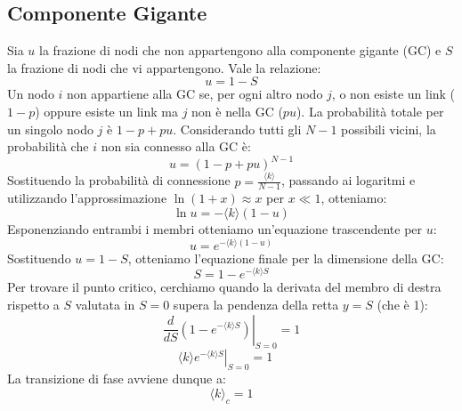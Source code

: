 \documentclass[12pt,italian]{article}
\begin{document}
\subsection{Componente Gigante}\label{sec:GC}
Sia $u$ la frazione di nodi che non appartengono alla componente gigante (GC) e $S$ la frazione di nodi che vi appartengono. Vale la relazione:
\begin{equation}
    u = 1 - S
\end{equation}
Un nodo $i$ non appartiene alla GC se, per ogni altro nodo $j$, o non esiste un link ($1-p$) oppure esiste un link ma $j$ non è nella GC ($pu$). La probabilità totale per un singolo nodo $j$ è
$1 - p + pu$.
Considerando tutti gli $N-1$ possibili vicini, la probabilità che $i$ non sia connesso alla GC è:
\begin{equation}
    u = (1 - p + pu)^{N-1}
\end{equation}
Sostituendo la probabilità di connessione $p = \frac{\langle k \rangle}{N-1}$, passando ai logaritmi e utilizzando l'approssimazione $\ln(1+x) \approx x$ per $x \ll 1$, otteniamo:
\begin{equation}
    \ln u = -\langle k \rangle (1-u)
\end{equation}
Esponenziando entrambi i membri otteniamo un'equazione trascendente per $u$:
\begin{equation}
    u = e^{-\langle k \rangle (1-u)}
\end{equation}
Sostituendo $u = 1 - S$, otteniamo l'equazione finale per la dimensione della GC:
\begin{equation}
    S = 1 - e^{-\langle k \rangle S}
\end{equation}
Per trovare il punto critico, cerchiamo quando la derivata del membro di destra rispetto a $S$ valutata in $S=0$ supera la pendenza della retta $y=S$ (che è 1):
\begin{equation}
    \left. \frac{d}{dS} (1 - e^{-\langle k \rangle S}) \right|_{S=0} = 1
\end{equation}
\begin{equation}
    \left. \langle k \rangle e^{-\langle k \rangle S} \right|_{S=0} = 1 \quad
\end{equation}
La transizione di fase avviene dunque a:
\begin{equation}
    \langle k \rangle_c = 1
\end{equation}
\end{document}
